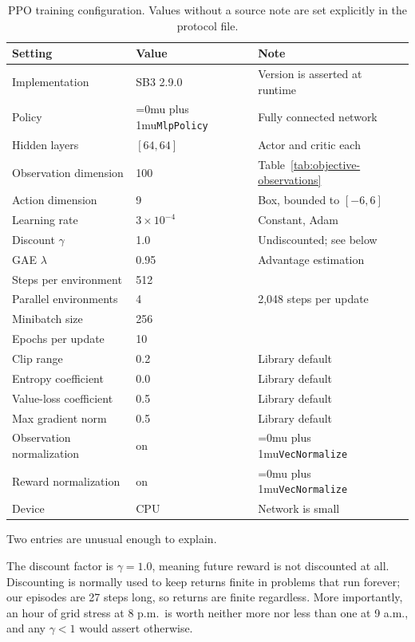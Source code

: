 ﻿\documentclass[12pt]{article}
\newcommand{\codepath}[1]{{\Urlmuskip=0mu plus 1mu\relax\nolinkurl{#1}}}
\begin{document}
\begin{table}[htbp]
  \centering
  \small
  \caption{PPO training configuration. Values without a source note are set
  explicitly in the protocol file.}
  \label{tab:ppo-hyperparameters}
  \begin{tabular}{@{}L{0.30\textwidth}L{0.18\textwidth}L{0.44\textwidth}@{}}
    \toprule
    Setting & Value & Note \\
    \midrule
    Implementation & SB3 2.9.0 & Version is asserted at runtime \\
    Policy & \codepath{MlpPolicy} & Fully connected network \\
    Hidden layers & \([64,64]\) & Actor and critic each \\
    Observation dimension & 100 & Table~\ref{tab:objective-observations} \\
    Action dimension & 9 & Box, bounded to \([-6,6]\) \\
    Learning rate & \(3\times10^{-4}\) & Constant, Adam \\
    Discount \(\gamma\) & 1.0 & Undiscounted; see below \\
    GAE \(\lambda\) & 0.95 & Advantage estimation \\
    Steps per environment & 512 & \\
    Parallel environments & 4 & 2,048 steps per update \\
    Minibatch size & 256 & \\
    Epochs per update & 10 & \\
    Clip range & 0.2 & Library default \\
    Entropy coefficient & 0.0 & Library default \\
    Value-loss coefficient & 0.5 & Library default \\
    Max gradient norm & 0.5 & Library default \\
    Observation normalization & on & \codepath{VecNormalize} \\
    Reward normalization & on & \codepath{VecNormalize} \\
    Device & CPU & Network is small \\
    \bottomrule
  \end{tabular}
\end{table}

Two entries are unusual enough to explain.

The discount factor is \(\gamma=1.0\), meaning future reward is not discounted
at all. Discounting is normally used to keep returns finite in problems that run
forever; our episodes are 27 steps long, so returns are finite regardless. More
importantly, an hour of grid stress at 8 p.m.\ is worth neither more nor less
than one at 9 a.m., and any \(\gamma<1\) would assert otherwise.
\end{document}
